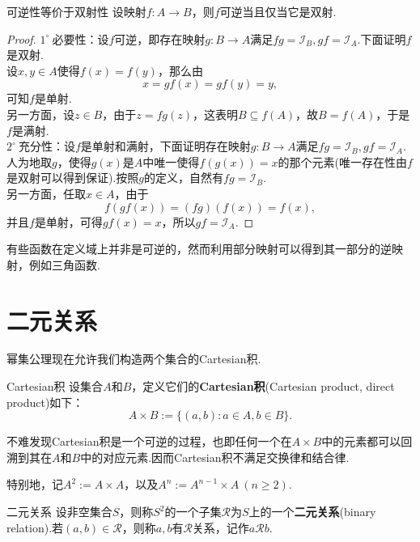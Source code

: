 \documentclass[lang=cn, zihao=5]{elegantbook}
\newcommand{\buzhou}[1]{$#1^{\circ} \ $}
\begin{document}
\begin{proposition}{可逆性等价于双射性}
	设映射$f:A \to B$，则$f$可逆当且仅当它是双射.
\end{proposition}
\begin{proof}
	\buzhou{1}必要性：设$f$可逆，即存在映射$g:B \to A$满足$fg=\mathcal{I}_B,gf=\mathcal{I}_A$.下面证明$f$是双射. \\
	设$x,y \in A$使得$f(x)=f(y)$，那么由$$x=gf(x)=gf(y)=y,$$可知$f$是单射. \\
	另一方面，设$z \in B$，由于$z=fg(z)$，这表明$B \subseteq f(A)$，故$B = f(A)$，于是$f$是满射. \\
	\buzhou{2}充分性：设$f$是单射和满射，下面证明存在映射$g:B \to A$满足$fg=\mathcal{I}_B,gf=\mathcal{I}_A$. \\
	人为地取$g$，使得$g(x)$是$A$中唯一使得$f(g(x))=x$的那个元素(唯一存在性由$f$是双射可以得到保证).按照$g$的定义，自然有$fg=\mathcal{I}_B$. \\
	另一方面，任取$x \in A$，由于$$f(gf(x)) = (fg)(f(x)) = f(x),$$并且$f$是单射，可得$gf(x)=x$，所以$gf=\mathcal{I}_A$.
\end{proof}

有些函数在定义域上并非是可逆的，然而利用部分映射可以得到其一部分的逆映射，例如三角函数.

\section{二元关系}

幂集公理现在允许我们构造两个集合的Cartesian积.

\begin{definition}{Cartesian积}
	设集合$A$和$B$，定义它们的\textbf{Cartesian积}(Cartesian product, direct product)如下：$$A \times B := \{ (a,b):a \in A,b \in B \}.$$
\end{definition}
\begin{remark}
	不难发现Cartesian积是一个可逆的过程，也即任何一个在$A \times B$中的元素都可以回溯到其在$A$和$B$中的对应元素.因而Cartesian积不满足交换律和结合律.
\end{remark}
\begin{remark}
	特别地，记$A^2:=A \times A$，以及$A^n := A^{n-1} \times A~(n \geq 2)$.
\end{remark}

\begin{definition}{二元关系}
	设非空集合$S$，则称$S^2$的一个子集$\mathcal{R}$为$S$上的一个\textbf{二元关系}(binary relation).若$(a,b) \in \mathcal{R}$，则称$a,b$有$\mathcal{R}$关系，记作$a\mathcal{R}b$.
\end{definition}
\end{document}
